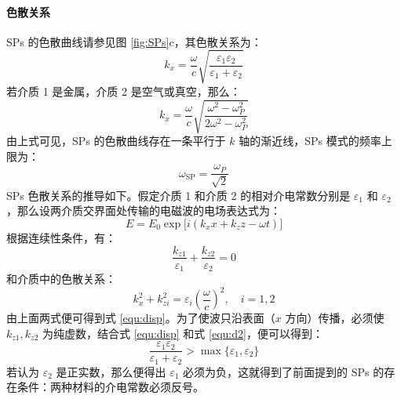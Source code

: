 \paragraph{色散关系}
SPs 的色散曲线请参见图 \ref{fig:SPs}c，其色散关系为：
\begin{equation}
\label{equ:disp}
k_x = \dfrac{\omega}{c}\sqrt{\dfrac{\phantom{|}\varepsilon_1\varepsilon_2\phantom{|}}{\varepsilon_1+\varepsilon_2}}
\end{equation}
若介质 1 是金属，介质 2 是空气或真空，那么：
\[
	k_x = \dfrac{\omega}{c}\sqrt{\dfrac{\omega^2-\omega_P^2}{2\omega^2-\omega_P^2}}
\]
由上式可见，SPs 的色散曲线存在一条平行于 $k$ 轴的渐近线，SPs 模式的频率上限为：
\[
	\omega_{\text{SP}}=\dfrac{\omega_P}{\sqrt{2}}
\]
SPs 色散关系的推导如下。假定介质 1 和介质 2 的相对介电常数分别是 $\varepsilon_1$ 和
 $\varepsilon_2$，那么设两介质交界面处传输的电磁波的电场表达式为：
\[
	E = E_0\exp\big[i(k_xx+k_zz-\omega t)\big]
\]
根据连续性条件，有：
\begin{equation}
\label{equ:c1}
\dfrac{k_{z1}}{\varepsilon_1} + \dfrac{k_{z2}}{\varepsilon_2} = 0
\end{equation}
和介质中的色散关系：
\begin{equation}
\label{equ:d2}
k_x^2 + k_{zi}^2 = \varepsilon_i\left(\dfrac{\omega}{c}\right)^2,\quad i=1,2
\end{equation}
由上面两式便可得到式 \ref{equ:disp}。为了使波只沿表面（$x$ 方向）传播，必须使 $k_{z1},k_{z2}$ 为纯虚数，结合式 \ref{equ:disp} 和式 \ref{equ:d2}，便可以得到：
\[
	\dfrac{\varepsilon_1\varepsilon_2}{\varepsilon_1+\varepsilon_2} > \max\{\varepsilon_1, \varepsilon_2\}
\]
若认为 $\varepsilon_2$ 是正实数，那么便得出 $\varepsilon_1$ 必须为负，这就得到了前面提到的 SPs 的存在条件：两种材料的介电常数必须反号。

